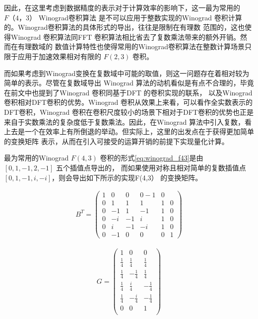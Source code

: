 因此，在这里考虑到数据精度的表示对于计算效率的影响下，这一最为常用的 $F（4， 3）$ Winograd卷积算法
是不可以应用于整数实现的Winograd 卷积计算的。Winograd卷积算法的具体形式的导出，往往是限制在有理数
范围的，这也使得Winograd 卷积算法同FFT 卷积算法相比省去了复数乘法带来的额外开销。然而在有理数域的
数值计算特性也使得常用的Winograd卷积算法在整数计算场景只限于应用于加速效果相对有限的 $F(2, 3)$ 卷积。

而如果考虑到Winograd变换在复数域中可能的取值，则这一问题存在着相对较为简单的表示。尽管在复数域导出
Winograd 算法的动机看似是有点不合理的，毕竟在前文中也提到了Winograd 卷积同基于DFT 的卷积实现的联系，
以及Winograd 卷积相对DFT卷积的优势。Winograd 卷积从效果上来看，可以看作全实数表示的DFT卷积，Winograd
卷积在卷积尺度较小的场景下相对于DFT卷积的优势也正是来自于实数乘法的复杂度低于复数乘法。因此，在Winograd
算法中引入复数，看上去是一个在效率上有所倒退的举动。但实际上，这里的出发点在于获得更加简单的变换矩阵
表示，从而在引入可接受的运算开销的前提下实现量化计算。

最为常用的Winograd $F(4, 3)$ 卷积的形式\ref{eq:winograd_f43}是由 $ [0, 1, -1, 2, -1]$ 五个插值点导出的，
而如果使用对称且相对简单的复数插值点 $[0, 1, -1, i, -i]$，则会导出如下所示的实现F(4,3） 的变换矩阵。

\begin{align}
  B^T = 
  \begin{pmatrix}
    1 & 0 & 0 & 0 -1 & 0 \\
    0 & 1 & 1 & 1 & 1 & 0\\
    0 & -1 & 1 & -1 & 1 & 0 \\
    0 & -i & -1 & i & 1 & 0 \\
    0 & i & -1 & -i & 1 & 0 \\
    0 & -1 & 0 & 0 & 0 & 1
  \end{pmatrix}
\end{align}

\begin{align}
G = 
\begin{pmatrix}
  1 & 0 & 0 \\
  \frac{1}{4} & \frac{1}{4} & \frac{1}{4} \\
  \frac{1}{4} & -\frac{1}{4} & \frac{1}{4} \\
  \frac{1}{4} & \frac{i}{4} & -\frac{1}{4} \\
  \frac{1}{4} & -\frac{i}{4} & -\frac{1}{4} \\
  0 & 0 & 1 \\
\end{pmatrix}
\end{align}

